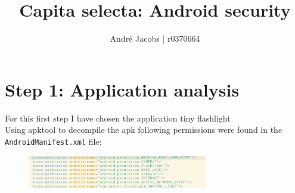 \documentclass[10pt,a4paper]{article}
\author{André Jacobs | r0370664}
\title{Capita selecta: Android security}
\begin{document}
\maketitle

\section{Step 1: Application analysis}
For this first step I have chosen the application tiny flashlight
\cite{playlink1}\cite{apklink1}\\
Using apktool to decompile the apk following permissions were found in the
\texttt{AndroidManifest.xml} file:\\
\begin{figure}[h!]
  \includegraphics[width=0.7\textwidth]{manifest1}
\end{figure}
\end{document}
